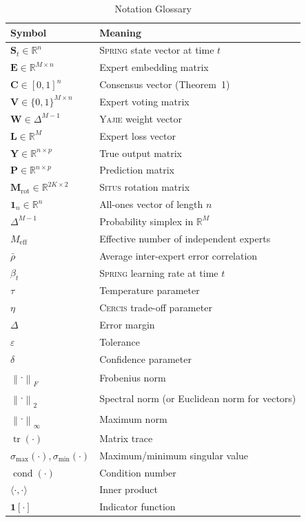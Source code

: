 \documentclass[12pt,a4paper]{article}
\theoremstyle{definition}
\newcommand{\Situs}{\textsc{Situs}}
\newcommand{\Yajie}{\textsc{Yajie}}
\newcommand{\Spring}{\textsc{Spring}}
\newcommand{\Cercis}{\textsc{Cercis}}
\DeclareMathOperator{\tr}{tr}
\DeclareMathOperator{\cond}{cond}
\newcommand{\R}{\mathbb{R}}
\newcommand{\ind}[1]{\mathbf{1}[#1]}
\newcommand{\norm}[1]{\left\lVert#1\right\rVert}
\newcommand{\inner}[2]{\langle #1, #2 \rangle}
\newcommand{\ones}{\mathbf{1}}
\newcommand{\mat}[1]{\mathbf{#1}}
\newcommand{\smax}{\sigma_{\max}}
\newcommand{\smin}{\sigma_{\min}}
\newcommand{\simplex}{\Delta}
\begin{document}
\begin{table}[htbp]
\centering
\caption{Notation Glossary }
\label{tab:notation}
\begin{tabular}{@{}p{3cm}p{10cm}@{}}
\toprule
\textbf{Symbol} & \textbf{Meaning} \\
\midrule
$\mat{S}_t \in \R^n$ & \Spring{} state vector at time $t$ \\
$\mat{E} \in \R^{M \times n}$ & Expert embedding matrix \\
$\mat{C} \in [0,1]^n$ & Consensus vector (Theorem~1) \\
$\mat{V} \in \{0,1\}^{M \times n}$ & Expert voting matrix \\
$\mat{W} \in \simplex^{M-1}$ & \Yajie{} weight vector \\
$\mat{L} \in \R^M$ & Expert loss vector \\
$\mat{Y} \in \R^{n \times p}$ & True output matrix \\
$\mat{P} \in \R^{n \times p}$ & Prediction matrix \\
$\mat{M}_{\text{rot}} \in \R^{2K \times 2}$ & \Situs{} rotation matrix \\
$\ones_n \in \R^n$ & All-ones vector of length $n$ \\
$\simplex^{M-1}$ & Probability simplex in $\R^M$ \\
$M_{\text{eff}}$ & Effective number of independent experts \\
$\bar{\rho}$ & Average inter-expert error correlation \\
$\beta_t$ & \Spring{} learning rate at time $t$ \\
$\tau$ & Temperature parameter \\
$\eta$ & \Cercis{} trade-off parameter \\
$\Delta$ & Error margin \\
$\varepsilon$ & Tolerance \\
$\delta$ & Confidence parameter \\
$\norm{\cdot}_F$ & Frobenius norm \\
$\norm{\cdot}_2$ & Spectral norm (or Euclidean norm for vectors) \\
$\norm{\cdot}_\infty$ & Maximum norm \\
$\tr(\cdot)$ & Matrix trace \\
$\smax(\cdot), \smin(\cdot)$ & Maximum/minimum singular value \\
$\cond(\cdot)$ & Condition number \\
$\inner{\cdot}{\cdot}$ & Inner product \\
$\ind{\cdot}$ & Indicator function \\
\bottomrule
\end{tabular}
\end{table}
\end{document}
